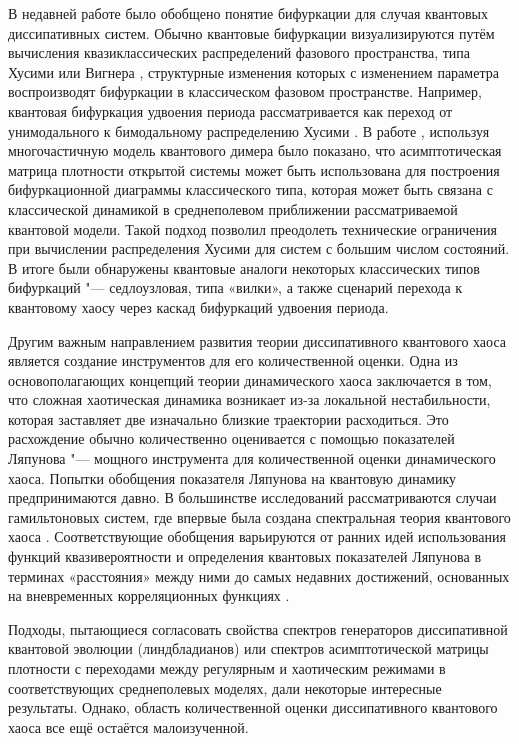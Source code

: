 В недавней работе \cite{Ivanchenko2017} было обобщено понятие бифуркации для случая квантовых диссипативных систем.
Обычно квантовые бифуркации визуализируются путём вычисления квазиклассических распределений фазового пространства, типа Хусими или Вигнера \cite{Stockmann2006}, структурные изменения которых с изменением параметра воспроизводят бифуркации в классическом фазовом пространстве. 
Например, квантовая бифуркация удвоения периода рассматривается как переход от унимодального к бимодальному распределению Хусими \cite{Hartmann2017, Wang2018}.
В работе \cite{Ivanchenko2017}, используя многочастичную модель квантового димера было показано, что асимптотическая матрица плотности открытой системы может быть использована для построения бифуркационной диаграммы классического типа, которая может быть связана с классической динамикой в среднеполевом приближении рассматриваемой квантовой модели.
Такой подход позволил преодолеть технические ограничения при вычислении распределения Хусими для систем с большим числом состояний.
В итоге были обнаружены квантовые аналоги некоторых классических типов бифуркаций "--- седлоузловая, типа «вилки», а также сценарий перехода к квантовому хаосу через каскад бифуркаций удвоения периода.

Другим важным направлением развития теории диссипативного квантового хаоса является создание инструментов для его количественной оценки.
Одна из основополагающих концепций теории динамического хаоса заключается в том, что сложная хаотическая динамика возникает из-за локальной нестабильности, которая заставляет две изначально близкие траектории расходиться. 
Это расхождение обычно количественно оценивается с помощью показателей Ляпунова "--- мощного инструмента для количественной оценки динамического хаоса.
Попытки обобщения показателя Ляпунова на квантовую динамику предпринимаются давно. 
В большинстве исследований рассматриваются случаи гамильтоновых систем, где впервые была создана спектральная теория квантового хаоса \cite{Haake2018}.
Соответствующие обобщения варьируются от ранних идей использования функций квазивероятности и определения квантовых показателей Ляпунова в терминах «расстояния» между ними \cite{Toda1987, Haake1992, Manko2000} до самых недавних достижений, основанных на вневременных корреляционных функциях \cite{Rozenbaum2017, Liao2018, ChavezCarlos2019}.

Подходы, пытающиеся согласовать свойства спектров генераторов диссипативной квантовой эволюции (линдбладианов) \cite{book2007} или спектров асимптотической матрицы плотности \cite{Hartmann2017, Ivanchenko2017, Prosen2013} с переходами между регулярным и хаотическим режимами в соответствующих среднеполевых моделях, дали некоторые интересные результаты. Однако, область количественной оценки диссипативного квантового хаоса все ещё остаётся малоизученной.

